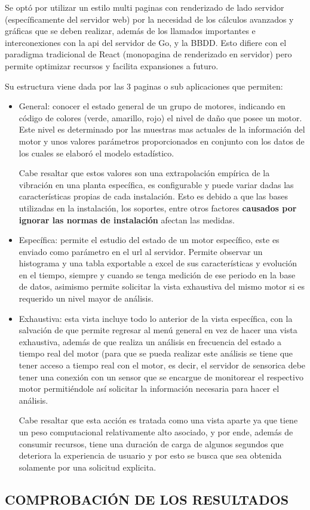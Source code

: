 Se optó por utilizar un
estilo multi paginas con renderizado de lado servidor (específicamente del
servidor web) por la necesidad de los cálculos avanzados y gráficas que
se deben realizar, además de los llamados importantes e interconexiones con la
api del servidor de Go, y la BBDD. Esto difiere con el paradigma tradicional de
React (monopagina de renderizado en servidor) pero permite optimizar recursos y
facilita expansiones a futuro.

Su estructura viene dada por las 3 paginas o sub aplicaciones que permiten:

\begin{itemize}
    \item General: conocer el estado general de un grupo de motores, indicando
        en código de colores (verde, amarillo, rojo) el nivel de daño que posee
        un motor. Este nivel es determinado por las muestras mas actuales de
        la información del motor y unos valores parámetros proporcionados en
        conjunto con los datos de los cuales se elaboró el modelo estadístico.

        Cabe resaltar que estos valores son una extrapolación empírica de la
        vibración en una planta específica, es configurable y puede variar dadas
        las características propias de cada instalación. Esto es debido a que
        las bases utilizadas en la instalación, los soportes, entre otros factores
        \textbf{causados por ignorar las normas de instalación} afectan las medidas.

    \item Específica:  permite el estudio del estado de un motor específico,
        este es enviado como parámetro en el url al servidor. Permite observar
        un histograma y una tabla exportable a excel de sus características y
        evolución en el tiempo, siempre y cuando se tenga medición de ese periodo
        en la base de datos, asimismo permite solicitar la vista exhaustiva del
        mismo motor si es requerido un nivel mayor de análisis.

    \item Exhaustiva: esta vista incluye todo lo anterior de la vista específica,
        con la salvación de que permite regresar al menú general en vez de hacer
        una vista exhaustiva, además de que realiza un análisis en frecuencia
        del estado a tiempo real del motor (para que se pueda realizar este
        análisis se tiene que tener acceso a tiempo real con el motor, es decir,
        el servidor de sensorica debe tener una conexión con un sensor que se
        encargue de monitorear el respectivo motor permitiéndole así solicitar
        la información necesaria para hacer el análisis.

        Cabe resaltar que esta acción es tratada como una vista aparte ya que
        tiene un peso computacional relativamente alto asociado, y por ende,
        además de consumir recursos, tiene una duración de carga de algunos
        segundos que deteriora la experiencia de usuario y por esto se busca que
        sea obtenida solamente por una solicitud explicita.
\end{itemize}




\subsection{COMPROBACIÓN DE LOS RESULTADOS}
